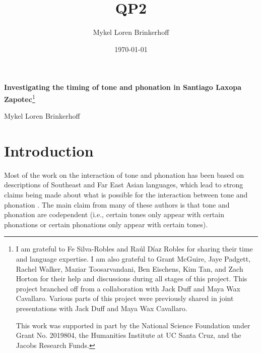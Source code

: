 \documentclass[12pt, letterpaper]{article}
\title{QP2}
\author{Mykel Loren Brinkerhoff}
\date{\today}
\begin{document}
	
	
	\onehalfspacing
	
\begin{center}
	{\Large \textbf{Investigating the timing of tone and phonation in Santiago Laxopa Zapotec}}\footnote{I am grateful to Fe Silva-Robles and  Raúl Díaz Robles for sharing their time and language expertise. I am also grateful to Grant McGuire,  Jaye Padgett, Rachel Walker, Maziar Toosarvandani, Ben Eischens, Kim Tan, and Zach Horton for their help and discussions during all stages of this project. This project branched off from a collaboration with Jack Duff and Maya Wax Cavallaro. Various parts of this project were previously shared in joint presentations with Jack Duff and Maya Wax Cavallaro.
	
	This work was supported in part by the National Science Foundation under Grant No. 2019804, the Humanities Institute at UC Santa Cruz, and the Jacobs Research Funds.}
	\vspace{6pt}

	Mykel Loren Brinkerhoff
\end{center}
\thispagestyle{fancy}



\section{Introduction} \label{sec:Introduction}

Most of the work on the interaction of tone and phonation has been based on descriptions of Southeast and Far East Asian languages, which lead to strong claims being made about what is possible for the interaction between tone and phonation \citep{masicaDefiningLinguisticArea1976,thurgoodVietnameseTonogenesisRevising2002,yipTone2002,enfieldArealLinguisticsMainland2005,michaudComplexTonesEast2012,brunelleTonePhonationSoutheast2016}. The main claim from many of these authors is that tone and phonation are codependent (i.e., certain tones only appear with certain phonations or certain phonations only appear with certain tones).
\end{document}
